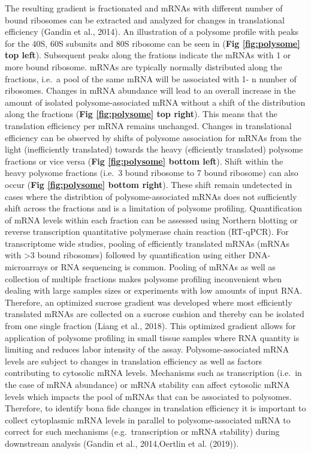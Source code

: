 \documentclass[12pt,openany]{book}
\begin{document}
The resulting gradient is fractionated and mRNAs with different number
of bound ribosomes can be extracted and analyzed for changes in
translational efficiency (Gandin et al., 2014). An illustration of a
polysome profile with peaks for the 40S, 60S subunits and 80S ribosome
can be seen in (\textbf{Fig \ref{fig:polysome} top left}). Subsequent
peaks along the frations indicate the mRNAs with 1 or more bound
ribosome. mRNAs are typically normally distributed along the fractions,
i.e.~a pool of the same mRNA will be associated with 1- n number of
ribosomes. Changes in mRNA abundance will lead to an overall increase in
the amount of isolated polysome-associated mRNA without a shift of the
distribution along the fractions (\textbf{Fig \ref{fig:polysome} top
right}). This means that the translation efficiency per mRNA remains
unchanged. Changes in translational efficiency can be observed by shifts
of polysome association for mRNAs from the light (inefficiently
translated) towards the heavy (efficiently translated) polysome
fractions or vice versa (\textbf{Fig \ref{fig:polysome} bottom left}).
Shift within the heavy polysome fractions (i.e.~3 bound ribosome to 7
bound ribosome) can also occur (\textbf{Fig \ref{fig:polysome} bottom
right}). These shift remain undetected in cases where the distribtion of
polysome-associated mRNAs does not sufficiently shift across the
fractions and is a limitation of polysome profiling. Quantification of
mRNA levels within each fraction can be assessed using Northern blotting
or reverse transcription quantitative polymerase chain reaction
(RT-qPCR). For transcriptome wide studies, pooling of efficiently
translated mRNAs (mRNAs with \textgreater{}3 bound ribosomes) followed
by quantification using either DNA-microarrays or RNA sequencing is
common. Pooling of mRNAs as well as collection of multiple fractions
makes polysome profiling inconvenient when dealing with large samples
sizes or experiments with low amounts of input RNA. Therefore, an
optimized sucrose gradient was developed where most efficiently
translated mRNAs are collected on a sucrose cushion and thereby can be
isolated from one single fraction (Liang et al., 2018). This optimized
gradient allows for application of polysome profiling in small tissue
samples where RNA quantity is limiting and reduces labor intensity of
the assay. Polysome-associated mRNA levels are subject to changes in
translation efficiency as well as factors contributing to cytosolic mRNA
levels. Mechanisms such as transcription (i.e.~in the case of mRNA
abundance) or mRNA stability can affect cytosolic mRNA levels which
impacts the pool of mRNAs that can be associated to polysomes.
Therefore, to identify bona fide changes in translation efficiency it is
important to collect cytoplasmic mRNA levels in parallel to
polysome-associated mRNA to correct for such mechanisms
(e.g.~transcription or mRNA stability) during downstream analysis
(Gandin et al., 2014,Oertlin et al. (2019)).
\end{document}
